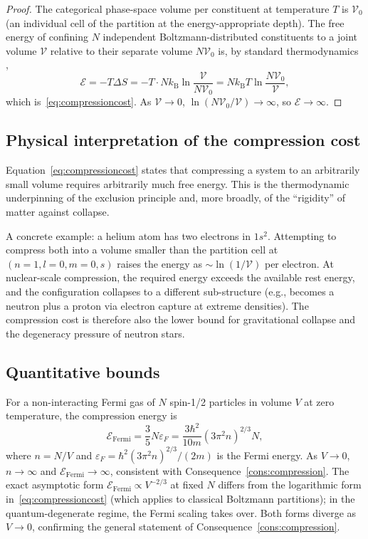 \documentclass[11pt,twocolumn,a4paper]{article}
\theoremstyle{axiomstyle}
\theoremstyle{conseqstyle}
\theoremstyle{definition}
\theoremstyle{remark}
\newcommand{\kB}{k_{\mathrm{B}}}
\begin{document}
\begin{proof}
The categorical phase-space volume per constituent at temperature $T$ is $\mathcal{V}_{0}$ (an individual cell of the partition at the energy-appropriate depth). The free energy of confining $N$ independent Boltzmann-distributed constituents to a joint volume $\mathcal{V}$ relative to their separate volume $N\mathcal{V}_{0}$ is, by standard thermodynamics \citep{landaulifshitz5},
\begin{equation*}
\mathcal{E}=-T\Delta S=-T\cdot N\kB\ln\!\frac{\mathcal{V}}{N\mathcal{V}_{0}}=N\kB T\ln\!\frac{N\mathcal{V}_{0}}{\mathcal{V}},
\end{equation*}
which is~\eqref{eq:compressioncost}. As $\mathcal{V}\to 0$, $\ln(N\mathcal{V}_{0}/\mathcal{V})\to\infty$, so $\mathcal{E}\to\infty$.
\end{proof}

\subsection{Physical interpretation of the compression cost}

Equation~\eqref{eq:compressioncost} states that compressing a system to an arbitrarily small volume requires arbitrarily much free energy. This is the thermodynamic underpinning of the exclusion principle and, more broadly, of the ``rigidity'' of matter against collapse.

A concrete example: a helium atom has two electrons in $1s^{2}$. Attempting to compress both into a volume smaller than the partition cell at $(n=1,l=0,m=0,s)$ raises the energy as $\sim\ln(1/\mathcal{V})$ per electron. At nuclear-scale compression, the required energy exceeds the available rest energy, and the configuration collapses to a different sub-structure (e.g., becomes a neutron plus a proton via electron capture at extreme densities). The compression cost is therefore also the lower bound for gravitational collapse and the degeneracy pressure of neutron stars.

\subsection{Quantitative bounds}

For a non-interacting Fermi gas of $N$ spin-1/2 particles in volume $V$ at zero temperature, the compression energy is
\begin{equation*}
\mathcal{E}_{\text{Fermi}}=\frac{3}{5}N\varepsilon_{F}=\frac{3\hbar^{2}}{10m}(3\pi^{2}n)^{2/3}N,
\end{equation*}
where $n=N/V$ and $\varepsilon_{F}=\hbar^{2}(3\pi^{2}n)^{2/3}/(2m)$ is the Fermi energy. As $V\to 0$, $n\to\infty$ and $\mathcal{E}_{\text{Fermi}}\to\infty$, consistent with Consequence~\ref{cons:compression}. The exact asymptotic form $\mathcal{E}_{\text{Fermi}}\propto V^{-2/3}$ at fixed $N$ differs from the logarithmic form in~\eqref{eq:compressioncost} (which applies to classical Boltzmann partitions); in the quantum-degenerate regime, the Fermi scaling takes over. Both forms diverge as $V\to 0$, confirming the general statement of Consequence~\ref{cons:compression}.
\end{document}
